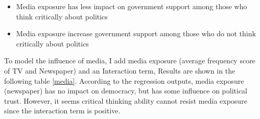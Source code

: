 \documentclass[12pt]{article}\usepackage[]{graphicx}\usepackage[]{color}
\begin{document}
\begin{itemize}
	\item Media exposure has less impact on government support among those who think critically about politics
	\item Media exposure increase government support among those who do not think critically about politics
\end{itemize}

To model the influence of media, I add media exposure (average frequency score of TV and Newspaper) and an Interaction term, Results are shown in the following table \ref{media}. According to the regression outputs, media exposure (newspaper) has no impact on democracy, but has some influence on political trust. However, it seems critical thinking  ability cannot resist media exposure since the interaction term is positive.
\end{document}
